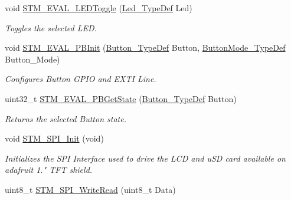 \begin{DoxyCompactItemize}
void \mbox{\hyperlink{group___s_t_m32_f1_x_x___n_u_c_l_e_o___l_o_w___l_e_v_e_l___exported___functions_ga5b1ccd57cf505c1d41440e62a845e4a9}{S\+T\+M\+\_\+\+E\+V\+A\+L\+\_\+\+L\+E\+D\+Toggle}} (\mbox{\hyperlink{group___s_t_m32_f1_x_x___n_u_c_l_e_o___l_o_w___l_e_v_e_l___exported___types_gaa059704b7ca945eb9c1e7f2c3d03fecd}{Led\+\_\+\+Type\+Def}} Led)
\begin{DoxyCompactList}\small\item\em Toggles the selected L\+ED. \end{DoxyCompactList}\item 
void \mbox{\hyperlink{group___s_t_m32_f1_x_x___n_u_c_l_e_o___l_o_w___l_e_v_e_l___exported___functions_ga1cdc19fe328ddcd17bf50fcb62d78369}{S\+T\+M\+\_\+\+E\+V\+A\+L\+\_\+\+P\+B\+Init}} (\mbox{\hyperlink{group___s_t_m32_f1_x_x___n_u_c_l_e_o___l_o_w___l_e_v_e_l___exported___types_ga643816dfbad5c734fc25a29ce8d35bb1}{Button\+\_\+\+Type\+Def}} Button, \mbox{\hyperlink{group___s_t_m32_f1_x_x___n_u_c_l_e_o___l_o_w___l_e_v_e_l___exported___types_ga48825b7c7d851c440ef8e808fd9d8f0a}{Button\+Mode\+\_\+\+Type\+Def}} Button\+\_\+\+Mode)
\begin{DoxyCompactList}\small\item\em Configures Button G\+P\+IO and E\+X\+TI Line. \end{DoxyCompactList}\item 
uint32\+\_\+t \mbox{\hyperlink{group___s_t_m32_f1_x_x___n_u_c_l_e_o___l_o_w___l_e_v_e_l___exported___functions_ga812ee2a84aaed235587ac81eb9269442}{S\+T\+M\+\_\+\+E\+V\+A\+L\+\_\+\+P\+B\+Get\+State}} (\mbox{\hyperlink{group___s_t_m32_f1_x_x___n_u_c_l_e_o___l_o_w___l_e_v_e_l___exported___types_ga643816dfbad5c734fc25a29ce8d35bb1}{Button\+\_\+\+Type\+Def}} Button)
\begin{DoxyCompactList}\small\item\em Returns the selected Button state. \end{DoxyCompactList}\item 
void \mbox{\hyperlink{group___s_t_m32_f1_x_x___n_u_c_l_e_o___l_o_w___l_e_v_e_l___exported___functions_ga7738cdccebd6af452a4843906acb8b31}{S\+T\+M\+\_\+\+S\+P\+I\+\_\+\+Init}} (void)
\begin{DoxyCompactList}\small\item\em Initializes the S\+PI Interface used to drive the L\+CD and u\+SD card available on adafruit 1." T\+FT shield. \end{DoxyCompactList}\item 
uint8\+\_\+t \mbox{\hyperlink{group___s_t_m32_f1_x_x___n_u_c_l_e_o___l_o_w___l_e_v_e_l___exported___functions_ga018a36360d14b84d8e0e0b2d2471d673}{S\+T\+M\+\_\+\+S\+P\+I\+\_\+\+Write\+Read}} (uint8\+\_\+t Data)

\end{DoxyCompactItemize}
